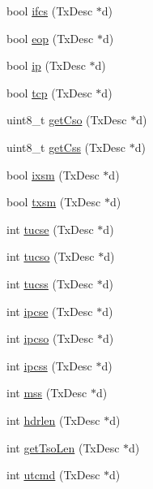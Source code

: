 \begin{DoxyCompactItemize}
\item 
bool \hyperlink{namespaceiGbReg_1_1TxdOp_a49dc5f1335d0bf1b0b00364d4bf67402}{ifcs} (TxDesc $\ast$d)
\item 
bool \hyperlink{namespaceiGbReg_1_1TxdOp_a0e51e7a024606345d359fc17d3af7c9c}{eop} (TxDesc $\ast$d)
\item 
bool \hyperlink{namespaceiGbReg_1_1TxdOp_a95c40243f7e4760653e10ce95673f381}{ip} (TxDesc $\ast$d)
\item 
bool \hyperlink{namespaceiGbReg_1_1TxdOp_aff380643c92de5f84ae7d6675820723c}{tcp} (TxDesc $\ast$d)
\item 
uint8\_\-t \hyperlink{namespaceiGbReg_1_1TxdOp_ac61cebaf6df237614790bbd1f2376c38}{getCso} (TxDesc $\ast$d)
\item 
uint8\_\-t \hyperlink{namespaceiGbReg_1_1TxdOp_a81448192c44c2e6d07bdf88aecdb7afe}{getCss} (TxDesc $\ast$d)
\item 
bool \hyperlink{namespaceiGbReg_1_1TxdOp_ad3912371dfd0afe6467b8612bb0c040e}{ixsm} (TxDesc $\ast$d)
\item 
bool \hyperlink{namespaceiGbReg_1_1TxdOp_a0182840b987fe696a6728f84db149b74}{txsm} (TxDesc $\ast$d)
\item 
int \hyperlink{namespaceiGbReg_1_1TxdOp_a7e7992a96304e9319bf8788e4ba53838}{tucse} (TxDesc $\ast$d)
\item 
int \hyperlink{namespaceiGbReg_1_1TxdOp_acb1da37bb92cfcae7c477466c035aa7a}{tucso} (TxDesc $\ast$d)
\item 
int \hyperlink{namespaceiGbReg_1_1TxdOp_a409b5433c1fa1dbf05aded9da4d90622}{tucss} (TxDesc $\ast$d)
\item 
int \hyperlink{namespaceiGbReg_1_1TxdOp_a94ed3e1271c637556a5c15cf582f8214}{ipcse} (TxDesc $\ast$d)
\item 
int \hyperlink{namespaceiGbReg_1_1TxdOp_ab7b81a0cb8761fae8af2a578e4b0bb05}{ipcso} (TxDesc $\ast$d)
\item 
int \hyperlink{namespaceiGbReg_1_1TxdOp_a05698994ed2909120e188568af94c622}{ipcss} (TxDesc $\ast$d)
\item 
int \hyperlink{namespaceiGbReg_1_1TxdOp_a3c9424fedfd3337a1fbe2fdb133cec01}{mss} (TxDesc $\ast$d)
\item 
int \hyperlink{namespaceiGbReg_1_1TxdOp_a56155a1a3846877b600c56961f9ce28d}{hdrlen} (TxDesc $\ast$d)
\item 
int \hyperlink{namespaceiGbReg_1_1TxdOp_a48e87927f1617006b0965381efcf5dfd}{getTsoLen} (TxDesc $\ast$d)
\item 
int \hyperlink{namespaceiGbReg_1_1TxdOp_a9cfaa8cb088f6ce63b22853cd0e920bf}{utcmd} (TxDesc $\ast$d)
\end{DoxyCompactItemize}
